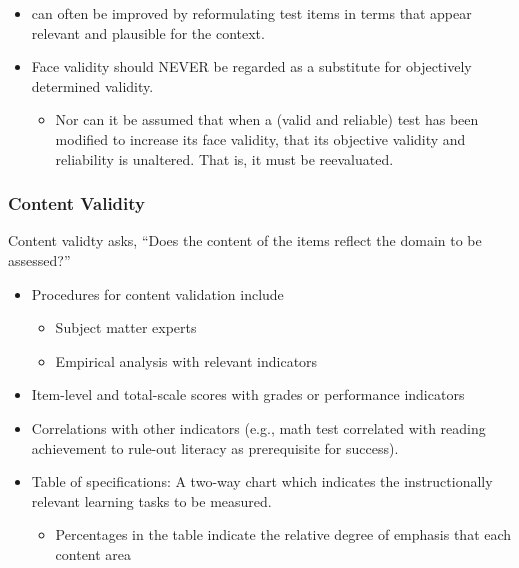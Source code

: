 \documentclass[
  english,
]{book}
\providecommand{\tightlist}{%
  \setlength{\itemsep}{0pt}\setlength{\parskip}{0pt}}
\begin{document}
\begin{itemize}
\tightlist
\item
  can often be improved by reformulating test items in terms that appear relevant and plausible for the context.
\item
  Face validity should NEVER be regarded as a substitute for objectively determined validity.

  \begin{itemize}
  \tightlist
  \item
    Nor can it be assumed that when a (valid and reliable) test has been modified to increase its face validity, that its objective validity and reliability is unaltered. That is, it must be reevaluated.
  \end{itemize}
\end{itemize}

\hypertarget{content-validity}{%
\subsubsection{Content Validity}\label{content-validity}}

Content validty asks, ``Does the content of the items reflect the domain to be assessed?''

\begin{itemize}
\tightlist
\item
  Procedures for content validation include

  \begin{itemize}
  \tightlist
  \item
    Subject matter experts
  \item
    Empirical analysis with relevant indicators
  \end{itemize}
\item
  Item-level and total-scale scores with grades or performance indicators
\item
  Correlations with other indicators (e.g., math test correlated with reading achievement to rule-out literacy as prerequisite for success).
\item
  Table of specifications: A two-way chart which indicates the instructionally relevant learning tasks to be measured.

  \begin{itemize}
  \tightlist
  \item
    Percentages in the table indicate the relative degree of emphasis that each content area
  \end{itemize}
\end{itemize}
\end{document}
